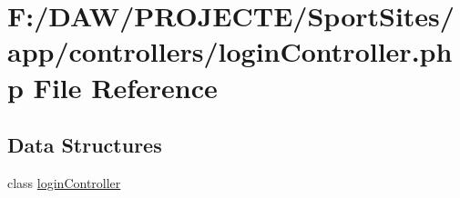 \hypertarget{login_controller_8php}{}\section{F\+:/\+D\+A\+W/\+P\+R\+O\+J\+E\+C\+T\+E/\+Sport\+Sites/app/controllers/login\+Controller.php File Reference}
\label{login_controller_8php}
\subsection*{Data Structures}
\begin{DoxyCompactItemize}
\item 
class \hyperlink{classlogin_controller}{login\+Controller}
\end{DoxyCompactItemize}
